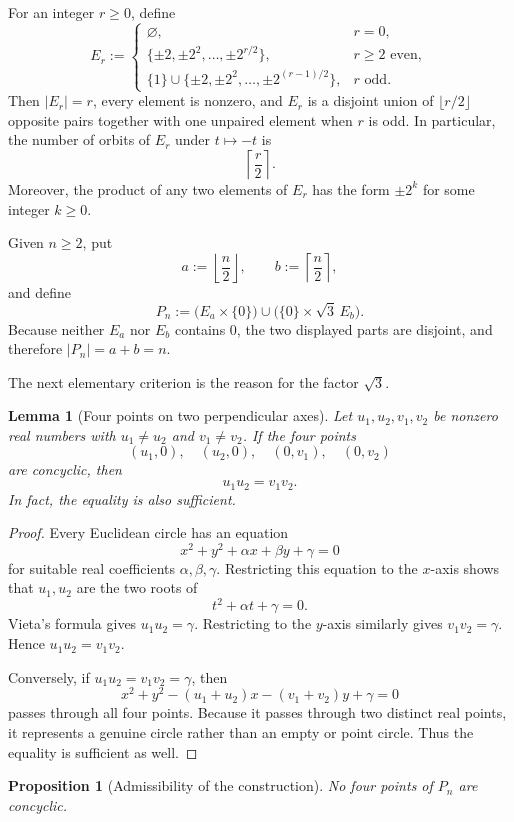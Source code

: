 \documentclass[11pt]{article}
\newtheorem{proposition}[proposition]{Proposition}
\newtheorem{lemma}[lemma]{Lemma}
\theoremstyle{definition}
\theoremstyle{remark}
\begin{document}
For an integer $r\ge0$, define
\[
 E_r:=
 \begin{cases}
  \varnothing,&r=0,\\[1mm]
  \{\pm2,\pm2^2,\ldots,\pm2^{r/2}\},&r\ge2\text{ even},\\[1mm]
  \{1\}\cup\{\pm2,\pm2^2,\ldots,\pm2^{(r-1)/2}\},&r\text{ odd}.
 \end{cases}
\]
Then $|E_r|=r$, every element is nonzero, and $E_r$ is a disjoint union of $\lfloor r/2\rfloor$ opposite pairs together with one unpaired element when $r$ is odd.  In particular, the number of orbits of $E_r$ under $t\mapsto-t$ is
\[
 \left\lceil\frac r2\right\rceil.
\]
Moreover, the product of any two elements of $E_r$ has the form $\pm2^k$ for some integer $k\ge0$.

Given $n\ge2$, put
\[
 a:=\left\lfloor\frac n2\right\rfloor,
 \qquad
 b:=\left\lceil\frac n2\right\rceil,
\]
and define
\[
 P_n:=\bigl(E_a\times\{0\}\bigr)
      \cup
      \bigl(\{0\}\times\sqrt3\,E_b\bigr).
\]
Because neither $E_a$ nor $E_b$ contains $0$, the two displayed parts are disjoint, and therefore $|P_n|=a+b=n$.

The next elementary criterion is the reason for the factor $\sqrt3$.

\begin{lemma}[Four points on two perpendicular axes]\label{lem:circlecriterion}
Let $u_1,u_2,v_1,v_2$ be nonzero real numbers with $u_1\ne u_2$ and $v_1\ne v_2$.  If the four points
\[
 (u_1,0),\quad (u_2,0),\quad (0,v_1),\quad (0,v_2)
\]
are concyclic, then
\[
 u_1u_2=v_1v_2.
\]
In fact, the equality is also sufficient.
\end{lemma}

\begin{proof}
Every Euclidean circle has an equation
\[
 x^2+y^2+\alpha x+\beta y+\gamma=0
\]
for suitable real coefficients $\alpha,\beta,\gamma$.  Restricting this equation to the $x$-axis shows that $u_1,u_2$ are the two roots of
\[
 t^2+\alpha t+\gamma=0.
\]
Vieta's formula gives $u_1u_2=\gamma$.  Restricting to the $y$-axis similarly gives $v_1v_2=\gamma$.  Hence $u_1u_2=v_1v_2$.

Conversely, if $u_1u_2=v_1v_2=\gamma$, then
\[
 x^2+y^2-(u_1+u_2)x-(v_1+v_2)y+\gamma=0
\]
passes through all four points.  Because it passes through two distinct real points, it represents a genuine circle rather than an empty or point circle.  Thus the equality is sufficient as well.
\end{proof}

\begin{proposition}[Admissibility of the construction]\label{prop:admissible}
No four points of $P_n$ are concyclic.
\end{proposition}
\end{document}
